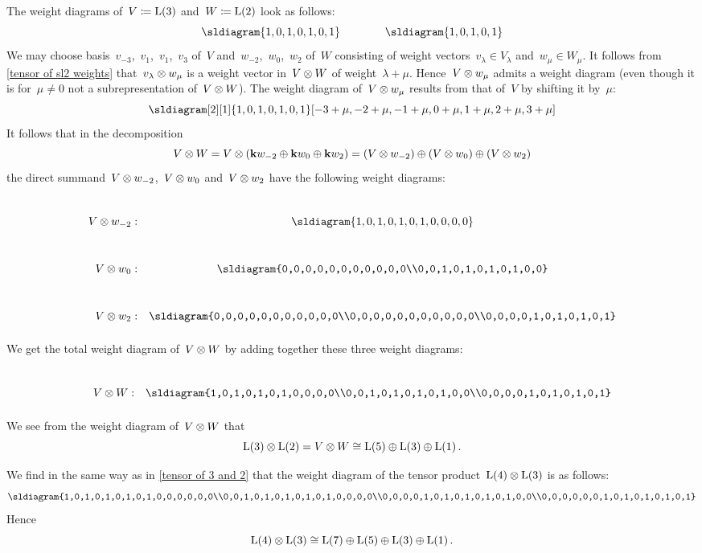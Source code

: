 \begin{example}
  \label{tensor of 3 and 2}
  The weight diagrams of~$V \coloneqq \operatorname{L}(3)$ and~$W \coloneqq \operatorname{L}(2)$ look as follows:
  \[
    \sldiagram{1,0,1,0,1,0,1}
    \qquad
    \qquad
    \sldiagram{1,0,1,0,1}
  \]
  We may choose basis~$v_{-3}$,~$v_1$,~$v_1$,~$v_3$ of~$V$ and~$w_{-2}$,~$w_0$,~$w_2$ of~$W$ consisting of weight vectors~$v_\lambda \in V_\lambda$ and~$w_\mu \in W_\mu$.
  It follows from \cref{tensor of sl2 weights} that~$v_\lambda \otimes w_\mu$ is a weight vector in~$V \otimes W$ of weight~$\lambda + \mu$.
  Hence~$V \otimes w_\mu$ admits a weight diagram (even though it is for~$\mu \neq 0$ not a subrepresentation of~$V \otimes W$).
  The weight diagram of~$V \otimes w_\mu$ results from that of~$V$ by shifting it by~$\mu$:
  \[
    \sldiagram[2][1]{1,0,1,0,1,0,1}[-3+\mu,-2+\mu,-1+\mu,0+\mu,1+\mu,2+\mu,3+\mu]
  \]
  It follows that in the decomposition
  \[
    V \otimes W
    =
    V \otimes (\mathbf{k} w_{-2} \oplus \mathbf{k} w_0 \oplus \mathbf{k} w_2)
    =
    (V \otimes w_{-2}) \oplus (V \otimes w_0) \oplus (V \otimes w_2)
  \]
  the direct summand~$V \otimes w_{-2}$,~$V \otimes w_0$ and~$V \otimes w_2$ have the following weight diagrams:
  \[
    \begingroup
    \renewcommand{\arraystretch}{3.5}
    \begin{array}{rc}
      V \tensor w_{-2}:
      &
      \sldiagram{1,0,1,0,1,0,1,0,0,0,0} \\
      V \tensor w_0:
      &
      \sldiagram{0,0,0,0,0,0,0,0,0,0,0\\0,0,1,0,1,0,1,0,1,0,0} \\
      V \tensor w_2:
      &
      \sldiagram{0,0,0,0,0,0,0,0,0,0,0\\0,0,0,0,0,0,0,0,0,0,0\\0,0,0,0,1,0,1,0,1,0,1}
    \end{array}
    \endgroup
  \]
  We get the total weight diagram of~$V \otimes W$ by adding together these three weight diagrams:
  \[
    \begin{array}{rc}
    V \tensor W:
    &
    \sldiagram{1,0,1,0,1,0,1,0,0,0,0\\0,0,1,0,1,0,1,0,1,0,0\\0,0,0,0,1,0,1,0,1,0,1}
    \end{array}
  \]
  We see from the weight diagram of~$V \otimes W$ that
  \[
    \operatorname{L}(3) \otimes \operatorname{L}(2)
    =
    V \otimes W
    \cong
    \operatorname{L}(5) \oplus \operatorname{L}(3) \oplus \operatorname{L}(1) \,.
  \]
\end{example}


\begin{example}
  \label{tensor of 4 and 3}
  We find in the same way as in \cref{tensor of 3 and 2} that the weight diagram of the tensor product~$\operatorname{L}(4) \otimes \operatorname{L}(3)$ is as follows:
  \[
    \sldiagram{1,0,1,0,1,0,1,0,1,0,0,0,0,0,0\\0,0,1,0,1,0,1,0,1,0,1,0,0,0,0\\0,0,0,0,1,0,1,0,1,0,1,0,1,0,0\\0,0,0,0,0,0,1,0,1,0,1,0,1,0,1}
  \]
  Hence
  \[
    \operatorname{L}(4) \otimes \operatorname{L}(3)
    \cong
    \operatorname{L}(7) \oplus \operatorname{L}(5) \oplus \operatorname{L}(3) \oplus \operatorname{L}(1)  \,.
  \]
\end{example}


